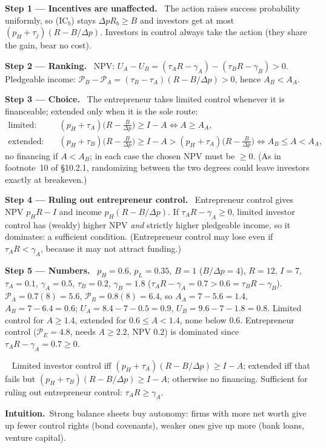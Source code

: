 \documentclass[11pt,a4paper]{article}
\newcommand{\step}[2]{\par\medskip\noindent\textbf{Step #1 --- #2.}~}
\newcommand{\intuition}{\par\medskip\noindent\textbf{Intuition.}~}
\newcommand{\answer}[1]{\par\smallskip\noindent\fbox{\textbf{Answer #1.}}~}
\newcommand{\dpp}{\Delta p}
\begin{document}
\step{1}{Incentives are unaffected} The action raises success probability uniformly, so (IC$_b$) stays $\dpp R_b\ge B$ and investors get at most $(p_H+\tau_j)(R-B/\dpp)$. Investors in control always take the action (they share the gain, bear no cost).

\step{2}{Ranking} NPV: $U_A-U_B=(\tau_AR-\gamma_A)-(\tau_BR-\gamma_B)>0$. Pledgeable income: $\mathcal P_B-\mathcal P_A=(\tau_B-\tau_A)(R-B/\dpp)>0$, hence $A_B<A_A$.

\step{3}{Choice} The entrepreneur takes limited control whenever it is financeable; extended only when it is the sole route:
\begin{align}
  \text{limited:}&\quad (p_H+\tau_A)\Big(R-\frac{B}{\dpp}\Big)\ge I-A \iff A\ge A_A, \label{r8e9-lim}\\
  \text{extended:}&\quad (p_H+\tau_B)\Big(R-\frac{B}{\dpp}\Big)\ge I-A>(p_H+\tau_A)\Big(R-\frac{B}{\dpp}\Big) \iff A_B\le A<A_A, \label{r8e9-ext}
\end{align}
no financing if $A<A_B$; in each case the chosen NPV must be $\ge0$. (As in footnote~10 of \S10.2.1, randomizing between the two degrees could leave investors exactly at breakeven.)

\step{4}{Ruling out entrepreneur control} Entrepreneur control gives NPV $p_HR-I$ and income $p_H(R-B/\dpp)$. If $\tau_AR-\gamma_A\ge0$, limited investor control has (weakly) higher NPV \emph{and} strictly higher pledgeable income, so it dominates: a sufficient condition. (Entrepreneur control may lose even if $\tau_AR<\gamma_A$, because it may not attract funding.)

\step{5}{Numbers} $p_H=0.6$, $p_L=0.35$, $B=1$ ($B/\dpp=4$), $R=12$, $I=7$, $\tau_A=0.1$, $\gamma_A=0.5$, $\tau_B=0.2$, $\gamma_B=1.8$ ($\tau_AR-\gamma_A=0.7>0.6=\tau_BR-\gamma_B$). $\mathcal P_A=0.7(8)=5.6$, $\mathcal P_B=0.8(8)=6.4$, so $A_A=7-5.6=1.4$, $A_B=7-6.4=0.6$; $U_A=8.4-7-0.5=0.9$, $U_B=9.6-7-1.8=0.8$. Limited control for $A\ge1.4$, extended for $0.6\le A<1.4$, none below $0.6$. Entrepreneur control ($\mathcal P_E=4.8$, needs $A\ge2.2$, NPV $0.2$) is dominated since $\tau_AR-\gamma_A=0.7\ge0$.

\answer{} Limited investor control iff $(p_H+\tau_A)(R-B/\dpp)\ge I-A$; extended iff that fails but $(p_H+\tau_B)(R-B/\dpp)\ge I-A$; otherwise no financing. Sufficient for ruling out entrepreneur control: $\tau_AR\ge\gamma_A$.

\intuition Strong balance sheets buy autonomy: firms with more net worth give up fewer control rights (bond covenants), weaker ones give up more (bank loans, venture capital).
\end{document}
